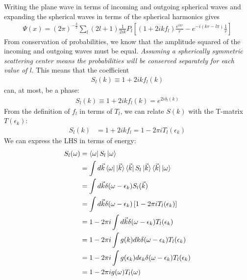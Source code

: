 \documentclass[twoside]{report}
\numberwithin{equation}{section}
\begin{document}
Writing the plane wave in terms of incoming and outgoing spherical waves and expanding the spherical waves in terms of the spherical harmonics gives
\begin{equation}\begin{aligned}
	\Psi(x) = \left(2\pi\right)^{-\frac{3}{2}}\sum_l (2l+1) \frac{1}{2ik}P_l\left[\left(1 + 2i k f_l \right) \frac{e^{ikr}}{r} - e^{-i\left( kr - l\pi \right) } \frac{1}{r}\right]
\end{aligned}\end{equation}
From conservation of probabilities, we know that the amplitude squared of the incoming and outgoing waves must be equal. \textit{Assuming a spherically symmetric scattering center means the probabilities will be conserved separately for each value of \(l\)}. This means that the coefficient 
\begin{equation}\begin{aligned}
	S_l(k) \equiv 1 + 2i k f_l (k)
\end{aligned}\end{equation}
can, at most, be a phase:
\begin{equation}\begin{aligned}
	S_l (k)\equiv 1 + 2i k f_l (k) = e^{2i\delta_l(k)}
\end{aligned}\end{equation}
From the definition of \(f_l\) in terms of \(T_l\), we can relate \(S(k)\) with the T-matrix \(T(\epsilon_k)\):
\begin{equation}\begin{aligned}
	S_l(k) &= 1 + 2i k f_l = 1 - 2 \pi i T_l(\epsilon_k)
\end{aligned}\end{equation}
We can express the LHS in terms of energy:
\begin{equation}\begin{aligned}
	S_l(\omega) &= \bra{\omega}S_l\ket{\omega} \\
			   &= \int d\vec k \bra{\omega}\ket{\vec k}\bra{\vec k}S_l\ket{\vec k}\bra{\vec k}\ket{\omega}\\
			   &= \int d\vec k \delta(\omega - \epsilon_k)S_l(\vec k)\\
			   &= \int d\vec k \delta(\omega - \epsilon_k)\left[1 - 2 \pi i T_l(\epsilon_k)\right]\\
			   &= 1 - 2 \pi i \int d\vec k \delta(\omega - \epsilon_k)T_l(\epsilon_k)\\
			   &= 1 - 2 \pi i \int g(k) d k \delta(\omega - \epsilon_k)T_l(\epsilon_k)\\
			   &= 1 - 2 \pi i \int g(\epsilon_k) d \epsilon_k \delta(\omega - \epsilon_k)T_l(\epsilon_k)\\
			   &= 1 - 2 \pi i g(\omega) T_l(\omega)
\end{aligned}\end{equation}
\end{document}

